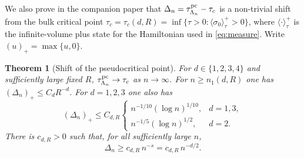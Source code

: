 \documentclass[11pt]{article}
\newtheorem{theorem}{Theorem}[section]
\theoremstyle{definition}
\newcommand{\E}{\mathbb E}
\begin{document}
We also prove in the companion paper \cite{obs-extension} that 
$\Delta_n=\tau_{\Lambda_n}^{\rm pc}-\tau_c$ is a non-trivial shift from the 
bulk critical point $\tau_c=\tau_c(d,R)=\inf\{\tau>0:\langle\sigma_0\rangle_\tau^+>0\}$,
where $\langle\cdot\rangle_\tau^+$ is the infinite-volume plus state for
the Hamiltonian used in \eqref{eq:measure}.
Write $(u)_+=\max\{u,0\}$.

\begin{theorem}[Shift of the pseudocritical point] \cite{obs-extension} 
\label{thm:pc-shift}
For $d\in\{1,2,3,4\}$ and sufficiently large fixed $R$,
$\tau_{\Lambda_n}^{\rm pc}\to\tau_c$ as $n\to\infty$.
For $n\ge n_1(d,R)$ one has $(\Delta_n)_+\le C_dR^{-d}$.
For $d=1,2,3$ one also has
\begin{equation}\label{eq:pc-shift-upper}
 (\Delta_n)_+\le C_{d,R}
 \begin{cases}
   n^{-1/10}(\log n)^{1/10}, & d=1,3,\\
   n^{-1/5}(\log n)^{1/2}, & d=2 .
 \end{cases}
\end{equation}
There is $c_{d,R}>0$ such that, for all sufficiently large $n$,
\begin{equation}\label{eq:pc-shift}
 \Delta_n\ge c_{d,R}\,n^{-s}=c_{d,R}\,n^{-d/2}.
\end{equation}
\end{theorem}




\end{document}
